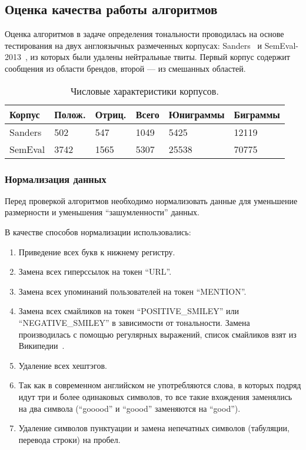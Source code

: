 \subsection{Оценка качества работы алгоритмов}

Оценка алгоритмов в задаче определения тональности проводилась на основе 
тестирования на двух англоязычных размеченных корпусах: Sanders~\cite{sanders} и SemEval-2013~\cite{semeval},
из которых были удалены нейтральные твиты. Первый корпус содержит 
сообщения из области брендов, второй --- из смешанных областей.


\begin{table}[h]
\caption{Числовые характеристики корпусов.}

	\begin{center}
	    \begin{tabular}{ | l | l | l | l | l | l |}
	    \hline
	    Корпус & Полож. & Отриц. & Всего & Юниграммы & Биграммы \\ \hline
	    Sanders & 502 & 547 & 1049 & 5425 & 12119 \\ \hline
	    SemEval & 3742 & 1565 & 5307 & 25538 & 70775\\ \hline
	    \hline
	    \end{tabular}
	\end{center}
\end{table}


\subsubsection{Нормализация данных}
Перед проверкой алгоритмов необходимо нормализовать данные
для уменьшение размерности и уменьшения ``зашумленности'' данных. 

В качестве способов нормализации использовались:
\begin{enumerate}

\item
Приведение всех букв к нижнему регистру.

\item
Замена всех гиперссылок на токен ``URL''.

\item
Замена всех упоминаний пользователей на токен ``MENTION''.

\item
Замена всех смайликов на токен ``POSITIVE\_SMILEY'' или ``NEGATIVE\_SMILEY'' в 
зависимости от тональности. Замена производилась с помощью регулярных
выражений, список смайликов взят из Википедии~\cite{emoticons}.

\item
Удаление всех хештэгов.

\item
Так как в современном английском не употребляются слова, в которых подряд
идут три и более одинаковых символов, то все такие вхождения заменялись на два символа (``gooood'' и ``goood'' заменяются на ``good'').

\item
Удаление символов пунктуации и замена непечатных символов (табуляции, перевода строки) на пробел.

\end{enumerate}


